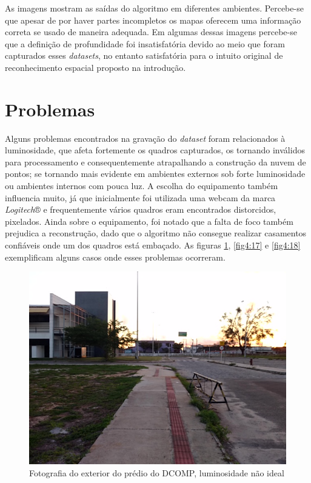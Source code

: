 As imagens mostram as saídas do algoritmo em diferentes ambientes. Percebe-se que apesar de por haver partes incompletos os mapas oferecem uma informação correta se usado de maneira adequada. Em algumas dessas imagens percebe-se que a definição de profundidade foi insatisfatória devido ao meio que foram capturados esses \textit{datasets}, no entanto satisfatória para o intuito original de reconhecimento espacial proposto na introdução.

\section{Problemas}

Alguns problemas encontrados na gravação do \textit{dataset} foram relacionados à luminosidade, que afeta fortemente os quadros capturados, os tornando inválidos para processamento e consequentemente atrapalhando a construção da nuvem de pontos; se tornando mais evidente em ambientes externos sob forte luminosidade ou ambientes internos com pouca luz. A escolha do equipamento também influencia muito, já que inicialmente foi utilizada uma webcam da marca \textit{Logitech}® e frequentemente vários quadros eram encontrados distorcidos, pixelados. Ainda sobre o equipamento, foi notado que a falta de foco também prejudica a reconstrução, dado que o algoritmo não consegue realizar casamentos confiáveis onde um dos quadros está embaçado. As figuras \ref{fig4:16}, \ref{fig4:17} e \ref{fig4:18}  exemplificam alguns casos onde esses problemas ocorreram.

\begin{figure}[!htb]
	\centering
		\includegraphics[width= \textwidth]{Imagens/figura4-16.jpg}
	\caption{Fotografia do exterior do prédio do DCOMP, luminosidade não ideal}
	\label{fig4:16}
\end{figure}

